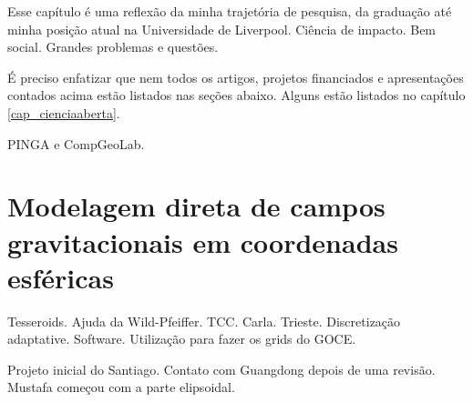 \documentclass[10pt,a4paper,oneside]{book}
\begin{document}

Esse capítulo é uma reflexão da minha trajetória de pesquisa, da graduação até
minha posição atual na Universidade de Liverpool.
Ciência de impacto.
Bem social.
Grandes problemas e questões.

É preciso enfatizar que nem todos os artigos, projetos financiados e
apresentações contados acima estão listados nas seções abaixo.
Alguns estão listados no capítulo \ref{cap_cienciaaberta}.

PINGA e CompGeoLab.

\section{Modelagem direta de campos gravitacionais em coordenadas esféricas}

Tesseroids.
Ajuda da Wild-Pfeiffer.
TCC.
Carla.
Trieste.
Discretização adaptative.
Software.
Utilização para fazer os grids do GOCE.

Projeto inicial do Santiago.
Contato com Guangdong depois de uma revisão.
Mustafa começou com a parte elipsoidal.
\end{document}
